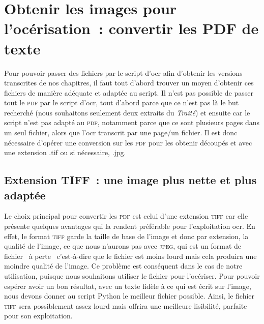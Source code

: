 \section{Obtenir les images pour l'océrisation~: convertir les PDF de texte}
Pour pouvoir passer des fichiers par le script d'\acrshort{ocr} afin d'obtenir les versions transcrites de nos chapitres, il faut tout d'abord trouver un moyen d'obtenir ces fichiers de manière adéquate et adaptée au script. Il n'est pas possible de passer tout le \textsc{pdf} par le script d'\acrshort{ocr}, tout d'abord parce que ce n'est pas là le but recherché (nous souhaitons seulement deux extraits du \textit{Traité}) et ensuite car le script n'est pas adapté au \textsc{pdf}, notamment parce que ce sont plusieurs pages dans un seul fichier, alors que l'\acrshort{ocr} transcrit par une page/un fichier. Il est donc nécessaire d'opérer une conversion sur les \textsc{pdf} pour les obtenir découpés et avec une extension .tif ou si nécessaire, .jpg.

\subsection{Extension TIFF~: une image plus nette et plus adaptée}
Le choix principal pour convertir les \textsc{pdf} est celui d'une extension \textsc{tiff} car elle présente quelques avantages qui la rendent préférable pour l'exploitation \acrshort{ocr}. En effet, le format \textsc{tiff} garde la taille de base de l'image et donc par extension, la qualité de l'image, ce que nous n'aurons pas avec \textsc{jpeg}, qui est un format de fichier \og~à perte~\fg{} c'est-à-dire que le fichier est moins lourd mais cela produira une moindre qualité de l'image. Ce problème est conséquent dans le cas de notre utilisation, puisque nous souhaitons utiliser le fichier pour l'océriser. Pour pouvoir espérer avoir un bon résultat, avec un texte fidèle à ce qui est écrit sur l'image, nous devons donner au script Python le meilleur fichier possible. Ainsi, le fichier \textsc{tiff} sera possiblement assez lourd mais offrira une meilleure lisibilité, parfaite pour son exploitation.

